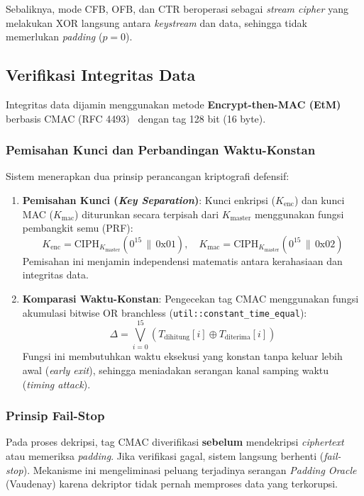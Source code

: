 Sebaliknya, mode CFB, OFB, dan CTR beroperasi sebagai \textit{stream cipher} yang melakukan XOR langsung antara \textit{keystream} dan data, sehingga tidak memerlukan \textit{padding} ($p = 0$).

\subsection{Verifikasi Integritas Data}
Integritas data dijamin menggunakan metode \textbf{Encrypt-then-MAC (EtM)} berbasis CMAC (RFC 4493)~\cite{rfc4493} dengan tag 128 bit (16 byte).

\subsubsection{Pemisahan Kunci dan Perbandingan Waktu-Konstan}
Sistem menerapkan dua prinsip perancangan kriptografi defensif:
\begin{enumerate}
  \item \textbf{Pemisahan Kunci (\textit{Key Separation})}: Kunci enkripsi ($K_{\text{enc}}$) dan kunci MAC ($K_{\text{mac}}$) diturunkan secara terpisah dari $K_{\text{master}}$ menggunakan fungsi pembangkit semu (PRF):
  \begin{equation}
    K_{\text{enc}} = \text{CIPH}_{K_{\text{master}}}(0^{15} \,\|\, \text{0x01}), \quad
    K_{\text{mac}} = \text{CIPH}_{K_{\text{master}}}(0^{15} \,\|\, \text{0x02})
  \end{equation}
  Pemisahan ini menjamin independensi matematis antara kerahasiaan dan integritas data.
  \item \textbf{Komparasi Waktu-Konstan}: Pengecekan tag CMAC menggunakan fungsi akumulasi bitwise OR branchless (\texttt{util::constant\_time\_equal}):
  \begin{equation}
    \Delta = \bigvee_{i=0}^{15} (T_{\text{dihitung}}[i] \oplus T_{\text{diterima}}[i])
  \end{equation}
  Fungsi ini membutuhkan waktu eksekusi yang konstan tanpa keluar lebih awal (\textit{early exit}), sehingga meniadakan serangan kanal samping waktu (\textit{timing attack}).
\end{enumerate}

\subsubsection{Prinsip Fail-Stop}
Pada proses dekripsi, tag CMAC diverifikasi \textbf{sebelum} mendekripsi \textit{ciphertext} atau memeriksa \textit{padding}. Jika verifikasi gagal, sistem langsung berhenti (\textit{fail-stop}). Mekanisme ini mengeliminasi peluang terjadinya serangan \textit{Padding Oracle} (Vaudenay) karena dekriptor tidak pernah memproses data yang terkorupsi.

